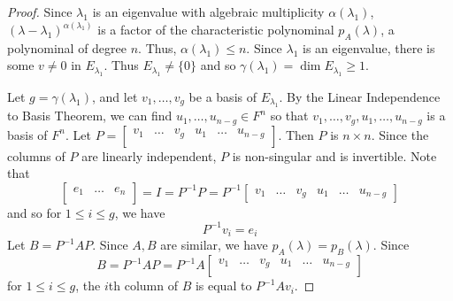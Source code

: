 \documentclass{article}
\begin{document}
\begin{proof}
  Since $\lambda_1$ is an eigenvalue with algebraic multiplicity $\alpha(\lambda_1)$, $(\lambda-\lambda_1)^{\alpha(\lambda_1)}$ is a factor of the characteristic polynominal $p_A(\lambda)$, a polynominal of degree $n$. Thus, $\alpha(\lambda_1) \leq n$.
  Since $\lambda_1$ is an eigenvalue, there is some $v \neq 0$ in $E_{\lambda_1}$. Thus $E_{\lambda_1} \neq \{0\}$ and so $\gamma(\lambda_1) = \dim E_{\lambda_1} \geq 1$.

  Let $g = \gamma(\lambda_1)$, and let $v_1, \ldots, v_g$ be a basis of $E_{\lambda_1}$. By the Linear Independence to Basis Theorem, we can find $u_1, \ldots, u_{n-g} \in F^n$ so that $v_1, \ldots, v_g, u_1, \ldots, u_{n-g}$ is a basis of $F^n$. Let $P =
    \begin{bmatrix}
      v_1 & \dots & v_g & u_1 & \dots & u_{n-g} \\
    \end{bmatrix}$. Then $P$ is $n \times n$. Since the columns of $P$ are linearly independent, $P$ is non-singular and is invertible. Note that \[
    \begin{bmatrix}
      e_1 & \dots & e_n \\
    \end{bmatrix} = I = P^{-1}P = P^{-1}
    \begin{bmatrix}
      v_1 & \dots & v_g & u_1 & \dots & u_{n-g}
    \end{bmatrix}
  \] and so for $1 \leq i \leq g$, we have \[
    P^{-1}v_i = e_i
  \]
  Let $B = P^{-1}AP$. Since $A, B$ are similar, we have $p_A(\lambda) = p_B(\lambda)$. Since \[
    B = P^{-1}AP = P^{-1}A
    \begin{bmatrix}
      v_1 & \dots & v_g & u_1 & \dots & u_{n-g} \\
    \end{bmatrix}
  \] for $1 \leq i \leq g$, the $i$th column of $B$ is equal to $P^{-1}Av_i$.


\end{proof}
\end{document}
